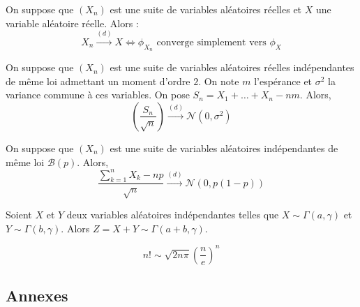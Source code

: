 
	\begin{theorem}[Lévy]
		On suppose que $(X_n)$ est une suite de variables aléatoires réelles et $X$ une variable aléatoire réelle. Alors :
		\[ X_n \overset{(d)}{\longrightarrow} X \iff \phi_{X_n} \text{ converge simplement vers } \phi_X \]
	\end{theorem}


	\begin{theorem}
		On suppose que $(X_n)$ est une suite de variables aléatoires réelles indépendantes de même loi admettant un moment d'ordre $2$. On note $m$ l'espérance et $\sigma^2$ la variance commune à ces variables. On pose $S_n = X_1 + \dots + X_n - nm$. Alors,
		\[ \left ( \frac{S_n}{\sqrt{n}} \right) \overset{(d)}{\longrightarrow} \mathcal{N}(0, \sigma^2) \]
	\end{theorem}

	\begin{application}
		On suppose que $(X_n)$ est une suite de variables aléatoires indépendantes de même loi $\mathcal{B}(p)$. Alors,
		\[ \frac{\sum_{k=1}^{n} X_k - np}{\sqrt{n}} \overset{(d)}{\longrightarrow} \mathcal{N}(0, p(1-p)) \]
	\end{application}


	\begin{lemma}
		Soient $X$ et $Y$ deux variables aléatoires indépendantes telles que $X \sim \Gamma(a, \gamma)$ et $Y \sim \Gamma(b, \gamma)$. Alors $Z = X + Y \sim \Gamma(a+b, \gamma)$.
	\end{lemma}


	\begin{application}
		\[ n! \sim \sqrt{2n\pi} \left(\frac{n}{e} \right)^n \]
	\end{application}

	\newpage
	\subsection*{Annexes}

